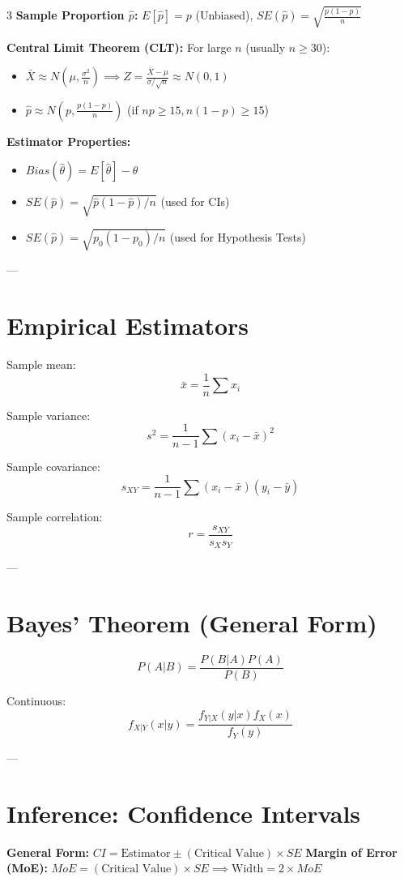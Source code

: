 \documentclass[10pt]{article}
\begin{document}
\begin{multicols}{3}
\textbf{Sample Proportion $\hat{p}$:} $E[\hat{p}]=p$ (Unbiased), $SE(\hat{p}) = \sqrt{\frac{p(1-p)}{n}}$

\textbf{Central Limit Theorem (CLT):}
For large $n$ (usually $n \ge 30$):
\begin{itemize}
    \item $\bar X \approx N\left(\mu, \frac{\sigma^2}{n}\right) \implies Z = \frac{\bar X-\mu}{\sigma/\sqrt n} \approx N(0,1)$
    \item $\hat{p} \approx N\left(p, \frac{p(1-p)}{n}\right)$ (if $np \ge 15, n(1-p) \ge 15$)
\end{itemize}

\textbf{Estimator Properties:}
\begin{itemize}
    \item $Bias(\hat{\theta}) = E[\hat{\theta}] - \theta$
    \item $SE(\hat{p}) = \sqrt{\hat{p}(1-\hat{p})/n}$ (used for CIs)
    \item $SE(\hat{p}) = \sqrt{p_0(1-p_0)/n}$ (used for Hypothesis Tests)
\end{itemize}

---

\section*{Empirical Estimators}

Sample mean:
\[
\bar x=\frac{1}{n}\sum x_i
\]

Sample variance:
\[
s^2=\frac{1}{n-1}\sum (x_i-\bar x)^2
\]

Sample covariance:
\[
s_{XY}=\frac{1}{n-1}\sum (x_i-\bar x)(y_i-\bar y)
\]

Sample correlation:
\[
r=\frac{s_{XY}}{s_X s_Y}
\]

---

\section*{Bayes' Theorem (General Form)}

\[
P(A|B)=\frac{P(B|A)P(A)}{P(B)}
\]

Continuous:
\[
f_{X|Y}(x|y)=\frac{f_{Y|X}(y|x)f_X(x)}{f_Y(y)}
\]

---

\section*{Inference: Confidence Intervals}
\textbf{General Form:} $CI = \text{Estimator} \pm (\text{Critical Value}) \times SE$
\textbf{Margin of Error (MoE):} $MoE = (\text{Critical Value}) \times SE \implies \text{Width} = 2 \times MoE$


\end{multicols}
\end{document}
